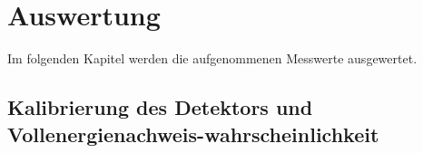 \section{Auswertung}\label{sec:auswertung}
Im folgenden Kapitel werden die aufgenommenen Messwerte ausgewertet.
\subsection{Kalibrierung des Detektors und Vollenergienachweis-wahrscheinlichkeit}